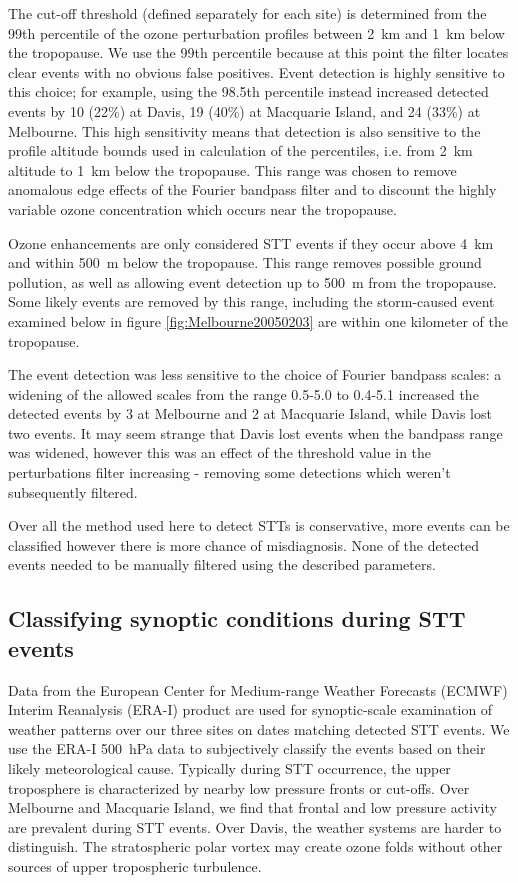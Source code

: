 \documentclass{article}
\begin{document}
    The cut-off threshold (defined separately for each site) is determined from the 99th percentile of the ozone perturbation profiles between 2~km and 1~km below the tropopause.
    We use the 99th percentile because at this point the filter locates clear events with no obvious false positives.
    Event detection is highly sensitive to this choice; for example, using the 98.5th percentile instead increased detected events by 10 (22\%) at Davis, 19 (40\%) at Macquarie Island, and 24 (33\%) at Melbourne.
    This high sensitivity means that detection is also sensitive to the profile altitude bounds used in calculation of the percentiles, i.e. from 2~km altitude to 1~km below the tropopause.
    This range was chosen to remove anomalous edge effects of the Fourier bandpass filter and to discount the highly variable ozone concentration which occurs near the tropopause.
    
    Ozone enhancements are only considered STT events if they occur above 4~km and within 500~m below the tropopause.
    This range removes possible ground pollution, as well as allowing event detection up to 500~m from the tropopause.
    Some likely events are removed by this range, including the storm-caused event examined below in figure \ref{fig:Melbourne20050203} are within one kilometer of the tropopause. 
    
    The event detection was less sensitive to the choice of Fourier bandpass scales: a widening of the allowed scales from the range 0.5-5.0 to 0.4-5.1 increased the detected events by 3 at Melbourne and 2 at Macquarie Island, while Davis lost two events.
    It may seem strange that Davis lost events when the bandpass range was widened, however this was an effect of the threshold value in the perturbations filter increasing - removing some detections which weren't subsequently filtered.
    
    Over all the method used here to detect STTs is conservative, more events can be classified however there is more chance of misdiagnosis. 
    None of the detected events needed to be manually filtered using the described parameters.

  \subsection{Classifying synoptic conditions during STT events}
  \label{Section:WeatherClassifications}
    Data from the European Center for Medium-range Weather Forecasts (ECMWF) Interim Reanalysis (ERA-I) \citep{Dee2011} product are used for synoptic-scale examination of weather patterns over our three sites on dates matching detected STT events.
    We use the ERA-I 500~hPa data to subjectively classify the events based on their likely meteorological cause.
    Typically during STT occurrence, the upper troposphere is characterized by nearby low pressure fronts or cut-offs.
    Over Melbourne and Macquarie Island, we find that frontal and low pressure activity are prevalent during STT events.
    Over Davis, the weather systems are harder to distinguish. The stratospheric polar vortex may create ozone folds without other sources of upper tropospheric turbulence.
\end{document}
